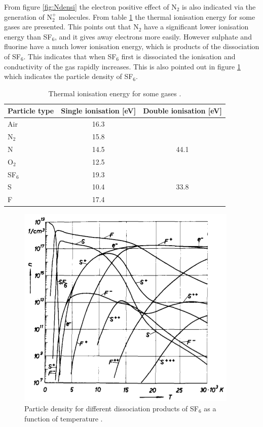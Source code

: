 \documentclass[10pt,a4paper]{article}
\begin{document}
From figure \ref{fig:Ndensi} the electron positive effect of N$_2$ is also indicated via the generation of N$_{2}^{+}$ molecules. From table \ref{tab:thermalIonisation} the thermal ionisation energy for some gases are presented. This points out that N$_2$ have a significant lower ionisation energy than SF$_6$, and it gives away electrons more easily. However sulphate and fluorine have a much lower ionisation energy, which is products of the dissociation of SF$_6$. This indicates that when SF$_6$ first is dissociated the ionisation and conductivity of the gas rapidly increases. This is also pointed out in figure \ref{fig:SF6densi} which indicates the particle density of SF$_6$.

\begin{table}[H]
\center
\caption{Thermal ionisation energy for some gases \cite{bib:HVEbreak}.}
\begin{tabular}{|l|c|c|}
\hline 
Particle type & Single ionisation [eV] & Double ionisation [eV] \\ 
\hline 
Air & 16.3 &  \\ 
\hline 
N$_2$ & 15.8 &  \\ 
\hline 
N & 14.5 & 44.1 \\ 
\hline 
O$_2$ & 12.5 &  \\ 
\hline 
SF$_6$ & 19.3 &  \\ 
\hline 
S & 10.4 & 33.8 \\ 
\hline 
F & 17.4 &  \\ 
\hline 
\end{tabular} 
\label{tab:thermalIonisation}
\end{table}

\begin{figure}[H]
\centering
\includegraphics[scale=0.5]{Bilder/Theory/particleDensSF6.png}
\caption{Particle density for different dissociation products of SF$_6$ as a function of temperature \cite{bib:IPSF6AQM}.} \label{fig:SF6densi}
\end{figure}
\end{document}
